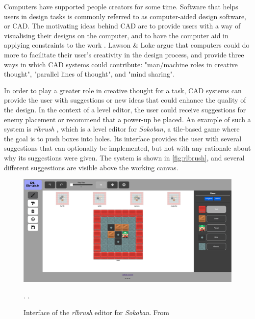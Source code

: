 
Computers have supported people creators for some time. Software that helps users in design
tasks is commonly referred to as computer-aided design software, or CAD. The motivating
ideas behind CAD are to provide users with a way of visualising their designs on the
computer, and to have the computer aid in applying constraints to the work
\cite{lawson1997}. Lawson & Loke argue that computers could do more to facilitate their
user's creativity in the design process, and provide three ways in which CAD systems could
contribute: "man/machine roles in creative thought", "parallel lines of thought", and "mind
sharing".

In order to play a greater role in creative thought for a task, CAD systems can provide the
user with suggestions or new ideas that could enhance the quality of the design. In the
context of a level editor, the user could receive suggestions for enemy placement or
recommend that a power-up be placed. An example of such a system is \emph{rlbrush} \cite{delarosa2021},
which is a level editor for \emph{Sokoban}, a tile-based game where the goal is to push
boxes into holes. Its interface provides the user with several suggestions that can
optionally be implemented, but not with any rationale about why its suggestions were given.
The system is shown in \autoref{fig:rlbrush}, and several different suggestions are visible
above the working canvas.

\begin{figure}[h]
    \includegraphics[width=\linewidth]{img/fig8-rlbrush.png}
    \caption{Interface of the \emph{rlbrush} editor for \emph{Sokoban}. From \cite{delarosa2021}}.
    \label{fig:rlbrush}.
\end{figure}

